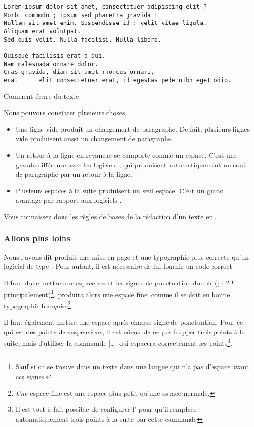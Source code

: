 \begin{listing}[ht]
\begin{verbatim}
Lorem ipsum dolor sit amet, consectetuer adipiscing elit ?
Morbi commodo ; ipsum sed pharetra gravida !
Nullam sit amet enim. Suspendisse id : velit vitae ligula.
Aliquam erat volutpat.
Sed quis velit. Nulla facilisi. Nulla libero. 

Quisque facilisis erat a dui.
Nam malesuada ornare dolor.
Cras gravida, diam sit amet rhoncus ornare, 
erat      elit consectetuer erat, id egestas pede nibh eget odio.
\end{verbatim}
\caption{Comment écrire du texte}
\end{listing}

Nous pouvons constater plusieurs choses.
\begin{itemize}
\item Une ligne vide produit un changement de paragraphe. De fait, plusieurs lignes vide produisent aussi un changement de paragraphe.
\item Un retour à la ligne en revanche se comporte comme un espace. C'est une grande différence avec les logiciels , qui produisent automatiquement un saut de paragraphe par un retour à la ligne.
\item Plusieurs espaces à la suite produisent un seul espace. C'est un grand avantage par rapport aux logiciels .
\end{itemize}

Vous connaissez donc les règles de bases de la rédaction d'un texte en .

\subsubsection{Allons plus loins}


Nous l'avons dit  produit une mise en page et une typographie plus correcte qu'un logiciel de type . Pour autant, il est nécessaire de lui fournir un code correct. 

Il faut donc mettre une espace avant les signes de ponctuation double (; : ? ! principalement)\footnote{Sauf si on se trouve dans un texte dans une langue qui n'a pas d'espace avant ces signes.}.  produira alors une espace fine, comme il se doit en bonne typographie fran\c caise\footnote{\emph{Une} espace fine est une espace plus petit qu'une espace normale.}

Il faut également mettre une espace après chaque signe de ponctuation. Pour ce qui est des points de suspensions, il est mieux de ne pas frapper trois points à la suite, mais d'utiliser la commande |\ldots| qui espacera correctement les points\footnote{Il est tout à fait possible de configurer l' pour qu'il remplace automatiquement trois points à la suite par cette commande}.

